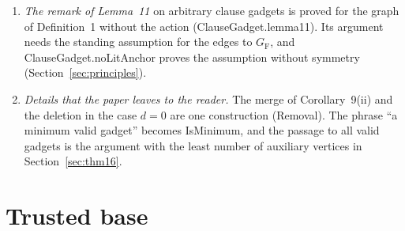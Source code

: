\documentclass[11pt,a4paper]{article}
\newcommand{\leanus}{\textunderscore\allowbreak}
\newcommand{\lean}[1]{{\ttfamily\let\_\leanus #1}}
\newcommand{\GF}{G_{\mathrm{F}}}
\begin{document}
\begin{enumerate}
\item \emph{The remark of Lemma~11} on arbitrary clause gadgets is proved
for the graph of Definition~1 without the action
(\lean{ClauseGadget.lemma11}). Its argument needs the standing assumption
for the edges to $\GF$, and \lean{ClauseGadget.noLitAnchor} proves the
assumption without symmetry (Section~\ref{sec:principles}).
\item \emph{Details that the paper leaves to the reader.} The merge of
Corollary~9(ii) and the deletion in the case $d=0$ are one construction
(\lean{Removal}). The phrase ``a minimum valid gadget'' becomes
\lean{IsMinimum}, and the passage to all valid gadgets is the argument with
the least number of auxiliary vertices in Section~\ref{sec:thm16}.
\end{enumerate}

\section{Trusted base}\label{sec:trust}
\end{document}
